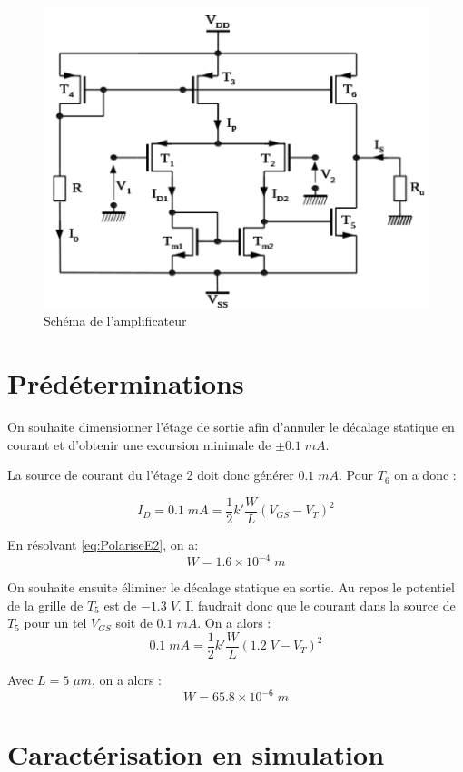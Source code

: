 \documentclass[french]{article}
\begin{document}
\begin{figure}[h!]
	\centering
	\includegraphics[height=0.25\textheight]{images/ampli.png}
	\caption{Schéma de l'amplificateur}
	\label{fig:ampli}
\end{figure}

\section{Prédéterminations}

On souhaite dimensionner l'étage de sortie afin d'annuler le décalage statique en courant et d'obtenir une excursion minimale de $\pm 0.1 \; mA$.

La source de courant du l'étage 2 doit donc générer $0.1 \; mA$. Pour $T_6$ on a donc :

\begin{equation}
I_D = 0.1 \; mA = \frac{1}{2} k' \frac{W}{L} (V_{GS} - V_T)^2 \label{eq:PolariseE2}
\end{equation}

En résolvant \ref{eq:PolariseE2}, on a:
\[
 \boxed{W = 1.6 \times 10 ^{-4} \;m}
\]

On souhaite ensuite éliminer le décalage statique en sortie. Au repos le potentiel de la grille de $T_5$ est de $-1.3 \; V$. Il faudrait donc que le courant dans la source de $T_5$ pour un tel $V_{GS}$ soit de $0.1 \; mA$. On a alors :
\begin{equation}
0.1 \;mA = \frac{1}{2} k' \frac{W}{L} (1.2 \; V - V_{T})^2
\end{equation}

Avec $L = 5 \; \mu m$, on a alors :
\[
\boxed{W = 65.8 \times 10 ^{-6} \;  m}
\]

\section{Caractérisation en simulation}
\end{document}
